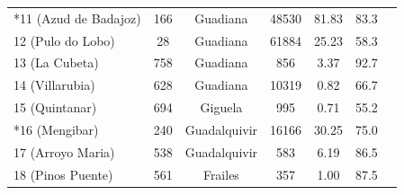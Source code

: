 \begin{table}[htbp]
{\begin{tabular}{lcccccc}
        *11 (Azud de Badajoz)   & 166   & Guadiana  & 48530     & 81.83  & 83.3 \\
        12 (Pulo do Lobo)       & 28    & Guadiana  & 61884     & 25.23  & 58.3 \\
        13 (La Cubeta)          & 758   & Guadiana  & 856       & 3.37   & 92.7 \\
        14 (Villarubia)         & 628   & Guadiana  & 10319     & 0.82   & 66.7 \\
        15 (Quintanar)          & 694   & Giguela   & 995       & 0.71   & 55.2 \\
        *16 (Mengibar)          & 240   & Guadalquivir & 16166  & 30.25  & 75.0 \\
        17 (Arroyo Maria)       & 538   & Guadalquivir & 583    & 6.19   & 86.5 \\
        18 (Pinos Puente)       & 561   & Frailes   & 357       & 1.00   & 87.5 \\
        \bottomrule
    \end{tabular}
    }
    \label{table:stations_data}
\end{table}

